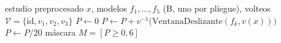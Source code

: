 \begin{algorithm}[h]
\caption{Predicción del sistema final para un estudio.}
\label{alg:final}
\small
\begin{algorithmic}[1]
\Require estudio preprocesado $x$, modelos $f_1,\dots,f_5$ (B, uno por pliegue), volteos $\mathcal{V} = \{\mathrm{id}, v_1, v_2, v_3\}$
\State $P \gets 0$
    \State $P \gets P + v^{-1}\big(\mathrm{VentanaDeslizante}(f_k, v(x))\big)$ 
  \EndFor
\EndFor
\State $P \gets P / 20$ 
\Ensure máscara $M = [P \geq 0{,}6]$
\end{algorithmic}
\end{algorithm}
